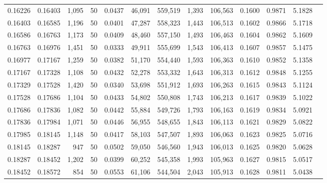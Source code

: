 \begin{tabular}{rrrrrrrrrrrrr}
0.16226 & 0.16403 & 1,095 &  50 &                                     0.0437 &  46,091 & 559,519 &   1,393 & 106,563 & 0.1600 & 0.9871 & 5.1828 \\
0.16403 & 0.16585 & 1,196 &  50 &                                     0.0401 &  47,287 & 558,323 &   1,443 & 106,513 & 0.1602 & 0.9866 & 5.1718 \\
0.16586 & 0.16763 & 1,173 &  50 &                                     0.0409 &  48,460 & 557,150 &   1,493 & 106,463 & 0.1604 & 0.9862 & 5.1609 \\
0.16763 & 0.16976 & 1,451 &  50 &                                     0.0333 &  49,911 & 555,699 &   1,543 & 106,413 & 0.1607 & 0.9857 & 5.1475 \\
0.16977 & 0.17167 & 1,259 &  50 &                                     0.0382 &  51,170 & 554,440 &   1,593 & 106,363 & 0.1610 & 0.9852 & 5.1358 \\
0.17167 & 0.17328 & 1,108 &  50 &                                     0.0432 &  52,278 & 553,332 &   1,643 & 106,313 & 0.1612 & 0.9848 & 5.1255 \\
0.17329 & 0.17528 & 1,420 &  50 &                                     0.0340 &  53,698 & 551,912 &   1,693 & 106,263 & 0.1615 & 0.9843 & 5.1124 \\
0.17528 & 0.17686 & 1,104 &  50 &                                     0.0433 &  54,802 & 550,808 &   1,743 & 106,213 & 0.1617 & 0.9839 & 5.1022 \\
0.17686 & 0.17836 & 1,082 &  50 &                                     0.0442 &  55,884 & 549,726 &   1,793 & 106,163 & 0.1619 & 0.9834 & 5.0921 \\
0.17836 & 0.17984 & 1,071 &  50 &                                     0.0446 &  56,955 & 548,655 &   1,843 & 106,113 & 0.1621 & 0.9829 & 5.0822 \\
0.17985 & 0.18145 & 1,148 &  50 &                                     0.0417 &  58,103 & 547,507 &   1,893 & 106,063 & 0.1623 & 0.9825 & 5.0716 \\
0.18145 & 0.18287 &   947 &  50 &                                     0.0502 &  59,050 & 546,560 &   1,943 & 106,013 & 0.1625 & 0.9820 & 5.0628 \\
0.18287 & 0.18452 & 1,202 &  50 &                                     0.0399 &  60,252 & 545,358 &   1,993 & 105,963 & 0.1627 & 0.9815 & 5.0517 \\
0.18452 & 0.18572 &   854 &  50 &                                     0.0553 &  61,106 & 544,504 &   2,043 & 105,913 & 0.1628 & 0.9811 & 5.0438 \\

\end{tabular}
